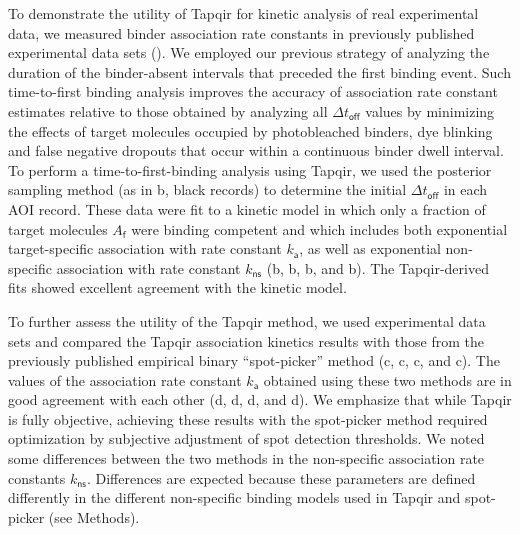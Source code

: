 To demonstrate the utility of Tapqir for kinetic analysis of real experimental data, we measured binder association rate constants in previously published experimental data sets ().  We employed our previous strategy  \citep{Friedman2012-if,Friedman2015-nx} of analyzing the duration of the binder-absent intervals that preceded the first binding event.  Such time-to-first binding analysis improves the accuracy of association rate constant estimates relative to those obtained by analyzing all $\Delta t_\mathsf{off}$ values by minimizing the effects of target molecules occupied by photobleached binders, dye blinking and false negative dropouts that occur within a continuous binder dwell interval.  To perform a time-to-first-binding analysis using Tapqir, we used the posterior sampling method (as in b, black records) to determine the initial $\Delta t_\mathsf{off}$ in each AOI record. These data were fit to a kinetic model \citep{Friedman2012-if,Friedman2015-nx} in which only a fraction of target molecules $A_\mathsf{f}$ were binding competent and which includes both exponential target-specific association with rate constant $k_\mathsf{a}$, as well as exponential non-specific association with rate constant $k_\mathsf{ns}$ (b, b, b, and b).  The Tapqir-derived fits showed excellent agreement with the kinetic model.  

To further assess the utility of the Tapqir method, we used experimental data sets and compared the Tapqir association kinetics results with those from the previously published empirical binary ``spot-picker'' method \citep{Friedman2015-nx} (c, c, c, and c). The values of the association rate constant $k_\mathsf{a}$ obtained using these two methods are in good agreement with each other (d, d, d, and d). We emphasize that while Tapqir is fully objective, achieving these results with the spot-picker method required optimization by subjective adjustment of spot detection thresholds.  We noted some differences between the two methods in the non-specific association rate constants $k_\mathsf{ns}$. Differences are expected because these parameters are defined differently in the different non-specific binding models used in Tapqir and  spot-picker (see Methods).



